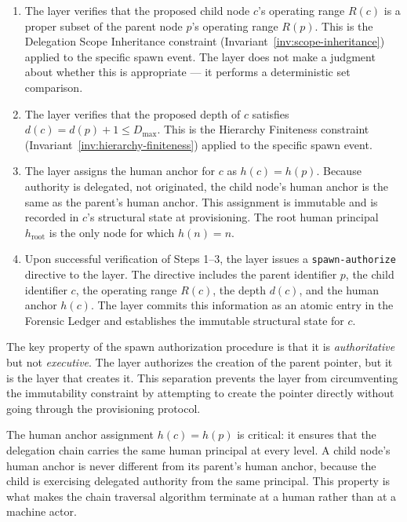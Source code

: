 \begin{enumerate}
\item[(\textit{Step 1 --- Intent Verification})] The \purpose{} layer verifies that the proposed child node $c$'s operating range $R(c)$ is a proper subset of the parent node $p$'s operating range $R(p)$. This is the Delegation Scope Inheritance constraint (Invariant~\ref{inv:scope-inheritance}) applied to the specific spawn event. The \purpose{} layer does not make a judgment about whether this is appropriate --- it performs a deterministic set comparison.

\item[(\textit{Step 2 --- Depth Verification})] The \purpose{} layer verifies that the proposed depth of $c$ satisfies $d(c) = d(p) + 1 \leq D_{\max}$. This is the Hierarchy Finiteness constraint (Invariant~\ref{inv:hierarchy-finiteness}) applied to the specific spawn event.

\item[(\textit{Step 3 --- Human Anchor Assignment})] The \purpose{} layer assigns the human anchor for $c$ as $h(c) = h(p)$. Because authority is delegated, not originated, the child node's human anchor is the same as the parent's human anchor. This assignment is immutable and is recorded in $c$'s structural state at provisioning. The root human principal $h_{\text{root}}$ is the only node for which $h(n) = n$.

\item[(\textit{Step 4 --- Authorization Directive})] Upon successful verification of Steps 1--3, the \purpose{} layer issues a \texttt{spawn-authorize} directive to the \fact{} layer. The directive includes the parent identifier $p$, the child identifier $c$, the operating range $R(c)$, the depth $d(c)$, and the human anchor $h(c)$. The \fact{} layer commits this information as an atomic entry in the Forensic Ledger and establishes the immutable structural state for $c$.
\end{enumerate}

The key property of the spawn authorization procedure is that it is \textit{authoritative} but not \textit{executive}. The \purpose{} layer authorizes the creation of the parent pointer, but it is the \fact{} layer that creates it. This separation prevents the \purpose{} layer from circumventing the immutability constraint by attempting to create the pointer directly without going through the provisioning protocol.

The human anchor assignment $h(c) = h(p)$ is critical: it ensures that the delegation chain carries the same human principal at every level. A child node's human anchor is never different from its parent's human anchor, because the child is exercising delegated authority from the same principal. This property is what makes the chain traversal algorithm terminate at a human rather than at a machine actor.

